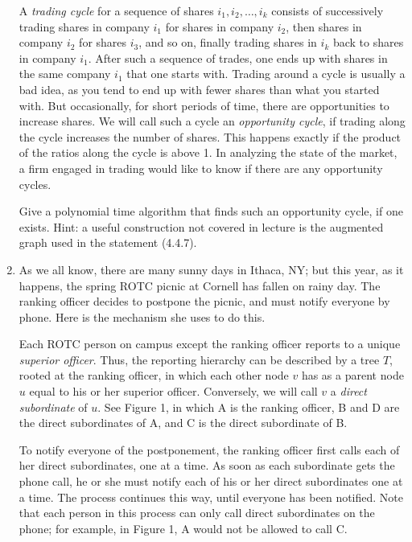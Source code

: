 \documentclass[12pt]{article}
\begin{document}
\begin{enumerate}
A {\em trading cycle} for a sequence of shares $i_1,i_2,\ldots,i_k$ consists
of successively trading shares in company $i_1$
for shares in company $i_2$, then shares in company $i_2$ for
shares $i_3$, and so on,
finally trading shares in $i_k$ back to shares in company $i_1$. After
such a sequence of trades, one ends up with shares in the same company
$i_1$ that one starts with. Trading around a cycle is usually a bad idea,
as you tend to end up with fewer shares than what you started with.  But
occasionally, for short periods of time, there are opportunities to
increase shares.  We will call such a cycle an {\em opportunity cycle}, if
trading along the cycle increases the number of shares. This happens
exactly if the product of the ratios along the cycle is above 1. In analyzing
the state of the market, a firm engaged in trading would 
like to know if there are any opportunity cycles.

Give a polynomial time algorithm that finds such an opportunity
cycle, if one exists.
Hint: a useful construction not covered in lecture is the augmented graph
used in the statement (4.4.7).


\item

As we all know, there are many sunny days in Ithaca, NY;
but this year, as it happens, the spring ROTC picnic at Cornell
has fallen on rainy day.
The ranking officer decides to postpone the picnic, and must
notify everyone by phone.
Here is the mechanism she uses to do this.

Each ROTC person on campus except the ranking officer
reports to a unique {\em superior officer}.
Thus, the reporting hierarchy can be described by
a tree $T$, rooted at the ranking officer, in which
each other node $v$ has as a parent node $u$ equal
to his or her superior officer.
Conversely, we will call $v$ a {\em direct subordinate} of $u$.
See Figure 1, in which A is the ranking officer,
B and D are the direct subordinates of A,
and C is the direct subordinate of B.

To notify everyone of the postponement, the ranking officer
first calls each of her direct subordinates, one at a time.
As soon as each subordinate gets the phone call, he or she
must notify each of his or her direct subordinates one at a time.
The process continues this way, until everyone has been notified.
Note that each person in this process can only call
direct subordinates on the phone;
for example, in Figure 1, A would not be allowed to call C.


\end{enumerate}
\end{document}
